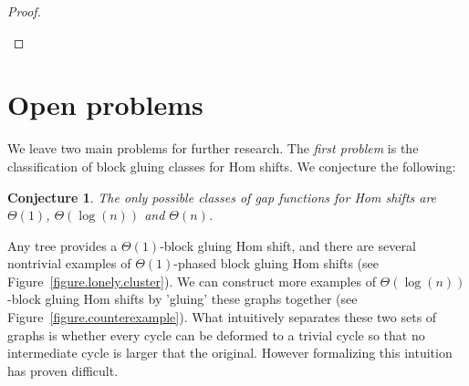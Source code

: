 \documentclass{article}
\newtheorem{conjecture}[theorem]{Conjecture}
\begin{document}
\begin{proof}
\begin{enumerate}

\end{enumerate}
\end{proof}


\section{Open problems\label{section.conclusion}} 

We leave two main problems for further research. The \textit{first problem} is the classification of block gluing classes for Hom shifts. We conjecture the following: 

\begin{conjecture}
The only possible classes of gap functions for Hom shifts are $\Theta(1)$, $\Theta(\log(n))$ and $\Theta(n)$.
\end{conjecture}

Any tree provides a $\Theta(1)$-block gluing Hom shift, and there are several nontrivial examples of $\Theta(1)$-phased block gluing Hom shifts (see Figure~\ref{figure.lonely.cluster}).
We can construct more examples of $\Theta(\log(n))$-block gluing Hom shifts by 'gluing' these graphs together (see Figure~\ref{figure.counterexample}). What intuitively separates these two sets of graphs is whether every cycle can be deformed to a trivial cycle so that no intermediate cycle is larger that the original. However formalizing this intuition has proven difficult.
\end{document}

